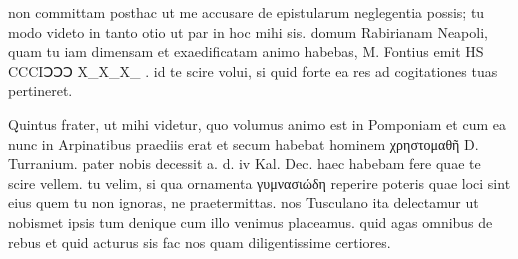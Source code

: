 


 non committam posthac ut me accusare de epistularum neglegentia possis; tu modo videto in tanto otio ut par in hoc mihi sis. domum Rabirianam Neapoli, quam tu iam dimensam et exaedificatam animo habebas, M. Fontius emit HS CCCIↃↃↃ X_X_X_ . id te scire volui, si quid forte ea res ad cogitationes tuas pertineret.

 Quintus frater, ut mihi videtur, quo volumus animo est in Pomponiam et cum ea nunc in Arpinatibus praediis erat et secum habebat hominem χρηστομαθῆ D. Turranium. pater nobis decessit a. d. iv Kal. Dec. haec habebam fere quae te scire vellem. tu velim, si qua ornamenta γυμνασιώδη reperire poteris quae loci sint eius quem tu non ignoras, ne praetermittas. nos Tusculano ita delectamur ut nobismet ipsis tum denique cum illo venimus placeamus. quid agas omnibus de rebus et quid acturus sis fac nos quam diligentissime certiores.
